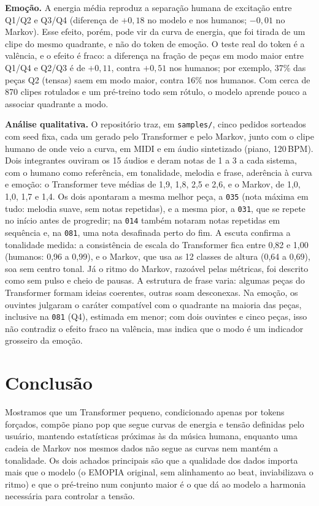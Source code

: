 \documentclass{article}
\begin{document}
\textbf{Emoção.} A energia média reproduz a separação humana de excitação entre Q1/Q2 e Q3/Q4 (diferença de $+0{,}18$ no modelo e nos humanos; $-0{,}01$ no Markov). Esse efeito, porém, pode vir da curva de energia, que foi tirada de um clipe do mesmo quadrante, e não do token de emoção. O teste real do token é a valência, e o efeito é fraco: a diferença na fração de peças em modo maior entre Q1/Q4 e Q2/Q3 é de $+0{,}11$, contra $+0{,}51$ nos humanos; por exemplo, 37\% das peças Q2 (tensas) saem em modo maior, contra 16\% nos humanos. Com cerca de 870 clipes rotulados e um pré-treino todo sem rótulo, o modelo aprende pouco a associar quadrante a modo.

\textbf{Análise qualitativa.} O repositório traz, em \texttt{samples/}, cinco pedidos sorteados com seed fixa, cada um gerado pelo Transformer e pelo Markov, junto com o clipe humano de onde veio a curva, em MIDI e em áudio sintetizado (piano, 120\,BPM). Dois integrantes ouviram os 15 áudios e deram notas de 1 a 3 a cada sistema, com o humano como referência, em tonalidade, melodia e frase, aderência à curva e emoção: o Transformer teve médias de 1,9, 1,8, 2,5 e 2,6, e o Markov, de 1,0, 1,0, 1,7 e 1,4. Os dois apontaram a mesma melhor peça, a \texttt{035} (nota máxima em tudo: melodia suave, sem notas repetidas), e a mesma pior, a \texttt{031}, que se repete no início antes de progredir; na \texttt{014} também notaram notas repetidas em sequência e, na \texttt{081}, uma nota desafinada perto do fim. A escuta confirma a tonalidade medida: a consistência de escala do Transformer fica entre 0,82 e 1,00 (humanos: 0,96 a 0,99), e o Markov, que usa as 12 classes de altura (0,64 a 0,69), soa sem centro tonal. Já o ritmo do Markov, razoável pelas métricas, foi descrito como sem pulso e cheio de pausas. A estrutura de frase varia: algumas peças do Transformer formam ideias coerentes, outras soam desconexas. Na emoção, os ouvintes julgaram o caráter compatível com o quadrante na maioria das peças, inclusive na \texttt{081} (Q4), estimada em menor; com dois ouvintes e cinco peças, isso não contradiz o efeito fraco na valência, mas indica que o modo é um indicador grosseiro da emoção.

\section{Conclusão}\label{sec:conclusao}

Mostramos que um Transformer pequeno, condicionado apenas por tokens forçados, compõe piano pop que segue curvas de energia e tensão definidas pelo usuário, mantendo estatísticas próximas às da música humana, enquanto uma cadeia de Markov nos mesmos dados não segue as curvas nem mantém a tonalidade. Os dois achados principais são que a qualidade dos dados importa mais que o modelo (o EMOPIA original, sem alinhamento ao beat, inviabilizava o ritmo) e que o pré-treino num conjunto maior é o que dá ao modelo a harmonia necessária para controlar a tensão.
\end{document}
